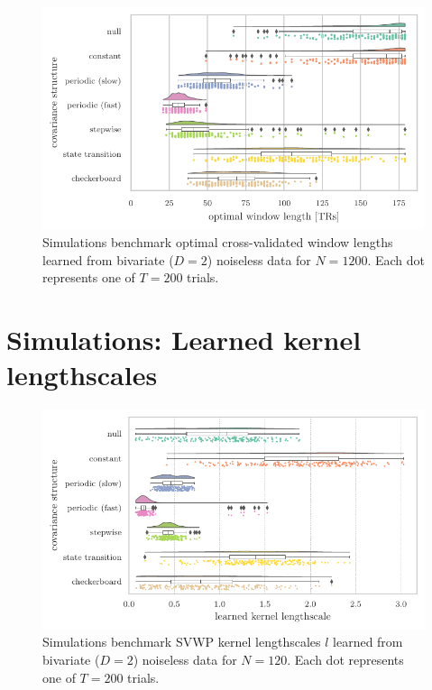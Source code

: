 \begin{figure}[ht]
  \centering
  \includegraphics[width=\textwidth]{fig/sim/d2/N1200_T0200/no_noise/SW_cross_validated_optimal_window_lengths}
  \caption{
    Simulations benchmark optimal cross-validated window lengths learned from bivariate ($D = 2$) noiseless data for $N = 1200$.
    Each dot represents one of $T = 200$ trials.
  }\label{fig:sim-optimal-window-lengths-N1200}
\end{figure}


\clearpage
\section{Simulations: Learned kernel lengthscales}\label{appendix:sim-kernel-lengthscales}


\begin{figure}[ht]
    \centering
    \includegraphics[width=\textwidth]{fig/sim/d2/N0120_T0200/no_noise/SVWP_kernel_lengthscales}
    \caption{
        Simulations benchmark SVWP kernel lengthscales $l$ learned from bivariate ($D = 2$) noiseless data for $N = 120$.
        Each dot represents one of $T = 200$ trials.
    }\label{fig:sim-learned-kernel-lengthscales-N120}
\end{figure}


